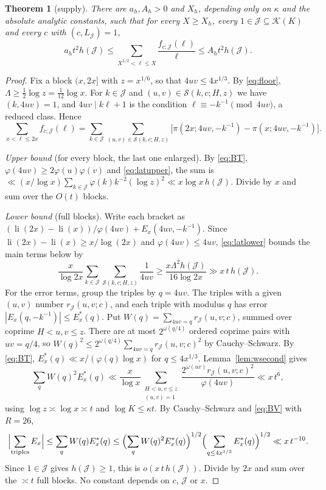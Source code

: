 \documentclass[10pt,reqno]{amsart}
\newtheorem{theorem}{Theorem}[section]
\theoremstyle{remark}
\newcommand{\K}{\mathcal K}
\newcommand{\J}{\mathcal J}
\newcommand{\Sset}{\mathcal S}
\newcommand{\li}{\operatorname{li}}
\begin{document}
\begin{theorem}[supply]\label{thm:supply}
There are $a_h,A_h>0$ and $X_h$, depending only on $\kappa$ and the
absolute analytic constants, such that for every $X\geq X_h$, every
$1\in\J\subseteq\K(K)$ and every $c$ with $(c,L_\J)=1$,
\begin{equation}\label{eq:supply}
 a_ht^2h(\J)\leq\sum_{X^{1/2}<\ell\leq X}\frac{f_{c;\J}(\ell)}{\ell}
 \leq A_ht^2h(\J).
\end{equation}
\end{theorem}
\begin{proof}
Fix a block $(x,2x]$ with $z=x^{1/6}$, so that $4uv\leq4x^{1/3}$.  By
\eqref{eq:floor}, $\Lambda\geq\frac12\log z=\frac1{12}\log x$.  For $k\in\J$
and $(u,v)\in\Sset(k,c;H,z)$ we have $(k,4uv)=1$, and $4uv\mid k\ell+1$
is the condition $\ell\equiv-k^{-1}\pmod{4uv}$, a reduced class.  Hence
\[
 \sum_{x<\ell\leq2x}f_{c;\J}(\ell)
 =\sum_{k\in\J}\sum_{(u,v)\in\Sset(k,c;H,z)}
 \bigl[\pi(2x;4uv,-k^{-1})-\pi(x;4uv,-k^{-1})\bigr].
\]

\emph{Upper bound} (for every block, the last one enlarged).
By \eqref{eq:BT}, $\varphi(4uv)\geq2\varphi(u)\varphi(v)$ and
\eqref{eq:latupper}, the sum is
$\ll(x/\log x)\sum_{k\in\J}\varphi(k)k^{-2}(\log z)^2\ll x\log x\,h(\J)$.
Divide by $x$ and sum over the $O(t)$ blocks.

\emph{Lower bound} (full blocks).  Write each bracket as
$(\li(2x)-\li(x))/\varphi(4uv)+E_x(4uv,-k^{-1})$.  Since
$\li(2x)-\li(x)\geq x/\log(2x)$ and $\varphi(4uv)\leq4uv$,
\eqref{eq:latlower} bounds the main terms below by
\[
 \frac{x}{\log2x}\sum_{k\in\J}\sum_{\Sset(k,c;H,z)}\frac1{4uv}
 \geq\frac{x\Lambda^2h(\J)}{16\log2x}\gg x\,t\,h(\J).
\]
For the error terms, group the triples by $q=4uv$.  The triples with a
given $(u,v)$ number $r_\J(u,v;c)$, and each triple with modulus $q$ has
error $|E_x(q,-k^{-1})|\leq E_x^*(q)$.  Put
$W(q)=\sum_{4uv=q}r_\J(u,v;c)$, summed over coprime $H<u,v\leq z$.  There
are at most $2^{\omega(q/4)}$ ordered coprime pairs with $uv=q/4$, so
$W(q)^2\leq2^{\omega(q/4)}\sum_{4uv=q}r_\J(u,v;c)^2$ by Cauchy--Schwarz.
By \eqref{eq:BT}, $E_x^*(q)\ll x/(\varphi(q)\log x)$ for $q\leq4x^{1/3}$.
Lemma~\ref{lem:wsecond} gives
\[
 \sum_qW(q)^2E^*_x(q)\ll\frac x{\log x}
 \sum_{\substack{H<u,v\leq z\\(u,v)=1}}
 \frac{2^{\omega(uv)}r_\J(u,v;c)^2}{\varphi(4uv)}\ll x\,t^6,
\]
using $\log z\asymp\log x\asymp t$ and $\log K\leq\kappa t$.  By
Cauchy--Schwarz and \eqref{eq:BV} with $R=26$,
\[
 \Bigl|\sum_{\rm triples}E_x\Bigr|\leq\sum_qW(q)E^*_x(q)
 \leq\Bigl(\sum_qW(q)^2E^*_x(q)\Bigr)^{1/2}
 \Bigl(\sum_{q\leq4x^{1/3}}E^*_x(q)\Bigr)^{1/2}\ll x\,t^{-10}.
\]
Since $1\in\J$ gives $h(\J)\geq1$, this is $o(x\,t\,h(\J))$.  Divide by
$2x$ and sum over the $\asymp t$ full blocks.  No constant depends on $c$,
$\J$ or $x$.
\end{proof}
\end{document}
